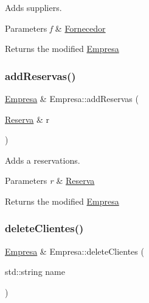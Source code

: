 Adds suppliers. 


\begin{DoxyParams}{Parameters}
{\em f} & \hyperlink{classFornecedor}{Fornecedor}\\
\hline
\end{DoxyParams}
\begin{DoxyReturn}{Returns}
the modified \hyperlink{classEmpresa}{Empresa} 
\end{DoxyReturn}
\mbox{\label{classEmpresa_a42a1671b234ab8380cfb2ed33517edb2}} 
\subsubsection{\texorpdfstring{add\+Reservas()}{addReservas()}}
{\footnotesize\ttfamily \hyperlink{classEmpresa}{Empresa} \& Empresa\+::add\+Reservas (\begin{DoxyParamCaption}\item[{\hyperlink{classReserva}{Reserva} \&}]{r }\end{DoxyParamCaption})}



Adds a reservations. 


\begin{DoxyParams}{Parameters}
{\em r} & \hyperlink{classReserva}{Reserva}\\
\hline
\end{DoxyParams}
\begin{DoxyReturn}{Returns}
the modified \hyperlink{classEmpresa}{Empresa} 
\end{DoxyReturn}
\mbox{\label{classEmpresa_a52b9f4d94c2a05704d74854ed4dd1590}} 
\subsubsection{\texorpdfstring{delete\+Clientes()}{deleteClientes()}}
{\footnotesize\ttfamily \hyperlink{classEmpresa}{Empresa} \& Empresa\+::delete\+Clientes (\begin{DoxyParamCaption}\item[{std\+::string}]{name }\end{DoxyParamCaption})}




